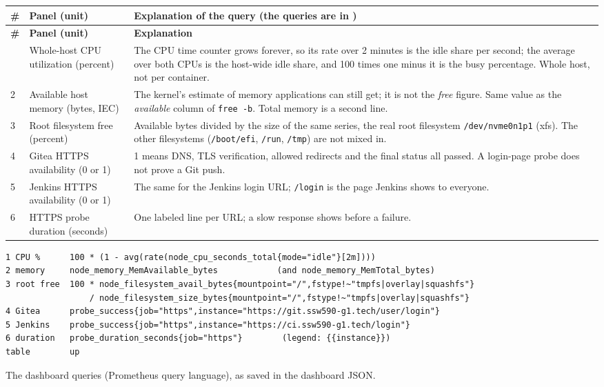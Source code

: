 \begin{tabularx}{\linewidth}{L{0.6cm}L{3.6cm}Y}
\caption{Dashboard panels and why their queries are written this way\label{Table:SrePanels}}\\
\toprule \textbf{\#} & \textbf{Panel (unit)} & \textbf{Explanation of the query (the queries are in )}\\ \midrule
\endfirsthead
\toprule \textbf{\#} & \textbf{Panel (unit)} & \textbf{Explanation}\\ \midrule
\endhead \bottomrule {} & Whole-host CPU utilization (percent) & The CPU time counter grows forever, so its rate over 2 minutes is the idle share per second; the average over both CPUs is the host-wide idle share, and 100 times one minus it is the busy percentage. Whole host, not per container.\\
2 & Available host memory (bytes, IEC) & The kernel's estimate of memory applications can still get; it is not the \emph{free} figure. Same value as the \emph{available} column of \texttt{free -b}. Total memory is a second line.\\
3 & Root filesystem free (percent) & Available bytes divided by the size of the same series, the real root filesystem \texttt{/dev/nvme0n1p1} (xfs). The other filesystems (\texttt{/boot/efi}, \texttt{/run}, \texttt{/tmp}) are not mixed in.\\
4 & Gitea HTTPS availability (0 or 1) & 1 means DNS, TLS verification, allowed redirects and the final status all passed. A login-page probe does not prove a Git push.\\
5 & Jenkins HTTPS availability (0 or 1) & The same for the Jenkins login URL; \texttt{/login} is the page Jenkins shows to everyone.\\
6 & HTTPS probe duration (seconds) & One labeled line per URL; a slow response shows before a failure.\\
\end{tabularx}

\begin{longlisting}
\begin{verbatim}
1 CPU %      100 * (1 - avg(rate(node_cpu_seconds_total{mode="idle"}[2m])))
2 memory     node_memory_MemAvailable_bytes            (and node_memory_MemTotal_bytes)
3 root free  100 * node_filesystem_avail_bytes{mountpoint="/",fstype!~"tmpfs|overlay|squashfs"}
                 / node_filesystem_size_bytes{mountpoint="/",fstype!~"tmpfs|overlay|squashfs"}
4 Gitea      probe_success{job="https",instance="https://git.ssw590-g1.tech/user/login"}
5 Jenkins    probe_success{job="https",instance="https://ci.ssw590-g1.tech/login"}
6 duration   probe_duration_seconds{job="https"}        (legend: {{instance}})
table        up
\end{verbatim}
\caption{The dashboard queries (Prometheus query language), as saved in the dashboard JSON.}
\label{Listing:ESreQueries}
\end{longlisting}

